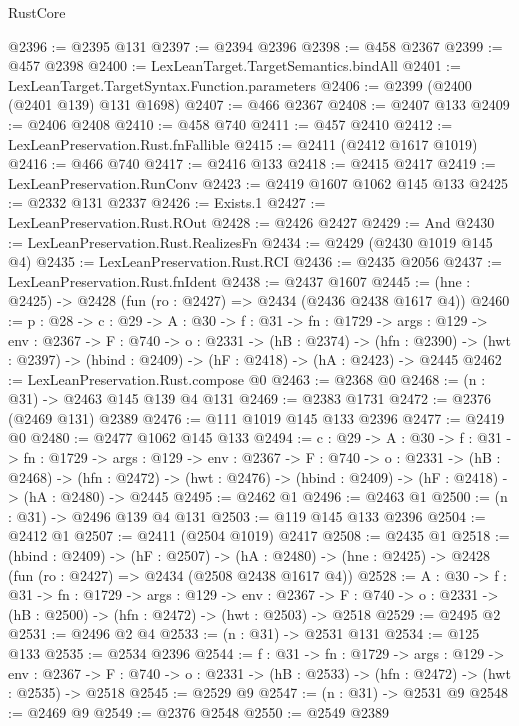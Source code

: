 \begin{lexlean}{RustCore}
\begin{coremodule}
@2396 := @2395 @131
@2397 := @2394 @2396
@2398 := @458 @2367
@2399 := @457 @2398
@2400 := LexLeanTarget.TargetSemantics.bindAll
@2401 := LexLeanTarget.TargetSyntax.Function.parameters
@2406 := @2399 (@2400 (@2401 @139) @131 @1698)
@2407 := @466 @2367
@2408 := @2407 @133
@2409 := @2406 @2408
@2410 := @458 @740
@2411 := @457 @2410
@2412 := LexLeanPreservation.Rust.fnFallible
@2415 := @2411 (@2412 @1617 @1019)
@2416 := @466 @740
@2417 := @2416 @133
@2418 := @2415 @2417
@2419 := LexLeanPreservation.RunConv
@2423 := @2419 @1607 @1062 @145 @133
@2425 := @2332 @131 @2337
@2426 := Exists.{1}
@2427 := LexLeanPreservation.Rust.ROut
@2428 := @2426 @2427
@2429 := And
@2430 := LexLeanPreservation.Rust.RealizesFn
@2434 := @2429 (@2430 @1019 @145 @4)
@2435 := LexLeanPreservation.Rust.RCI
@2436 := @2435 @2056
@2437 := LexLeanPreservation.Rust.fnIdent
@2438 := @2437 @1607
@2445 := (hne : @2425) -> @2428 (fun (ro : @2427) => @2434 (@2436 @2438 @1617 @4))
@2460 := {p : @28} ->
  {c : @29} ->
  {A : @30} ->
  {f : @31} ->
  {fn : @1729} ->
  {args : @129} ->
  {env : @2367} ->
  {F : @740} ->
  {o : @2331} ->
  (hB : @2374) ->
  (hfn : @2390) -> (hwt : @2397) -> (hbind : @2409) -> (hF : @2418) -> (hA : @2423) -> @2445
@2462 := LexLeanPreservation.Rust.compose @0
@2463 := @2368 @0
@2468 := (n : @31) -> @2463 @145 @139 @4 @131
@2469 := @2383 @1731
@2472 := @2376 (@2469 @131) @2389
@2476 := @111 @1019 @145 @133 @2396
@2477 := @2419 @0
@2480 := @2477 @1062 @145 @133
@2494 := {c : @29} ->
  {A : @30} ->
  {f : @31} ->
  {fn : @1729} ->
  {args : @129} ->
  {env : @2367} ->
  {F : @740} ->
  {o : @2331} ->
  (hB : @2468) ->
  (hfn : @2472) -> (hwt : @2476) -> (hbind : @2409) -> (hF : @2418) -> (hA : @2480) -> @2445
@2495 := @2462 @1
@2496 := @2463 @1
@2500 := (n : @31) -> @2496 @139 @4 @131
@2503 := @119 @145 @133 @2396
@2504 := @2412 @1
@2507 := @2411 (@2504 @1019) @2417
@2508 := @2435 @1
@2518 := (hbind : @2409) ->
  (hF : @2507) ->
  (hA : @2480) -> (hne : @2425) -> @2428 (fun (ro : @2427) => @2434 (@2508 @2438 @1617 @4))
@2528 := {A : @30} ->
  {f : @31} ->
  {fn : @1729} ->
  {args : @129} ->
  {env : @2367} ->
  {F : @740} -> {o : @2331} -> (hB : @2500) -> (hfn : @2472) -> (hwt : @2503) -> @2518
@2529 := @2495 @2
@2531 := @2496 @2 @4
@2533 := (n : @31) -> @2531 @131
@2534 := @125 @133
@2535 := @2534 @2396
@2544 := {f : @31} ->
  {fn : @1729} ->
  {args : @129} ->
  {env : @2367} ->
  {F : @740} -> {o : @2331} -> (hB : @2533) -> (hfn : @2472) -> (hwt : @2535) -> @2518
@2545 := @2529 @9
@2547 := (n : @31) -> @2531 @9
@2548 := @2469 @9
@2549 := @2376 @2548
@2550 := @2549 @2389

\end{coremodule}
\end{lexlean}
